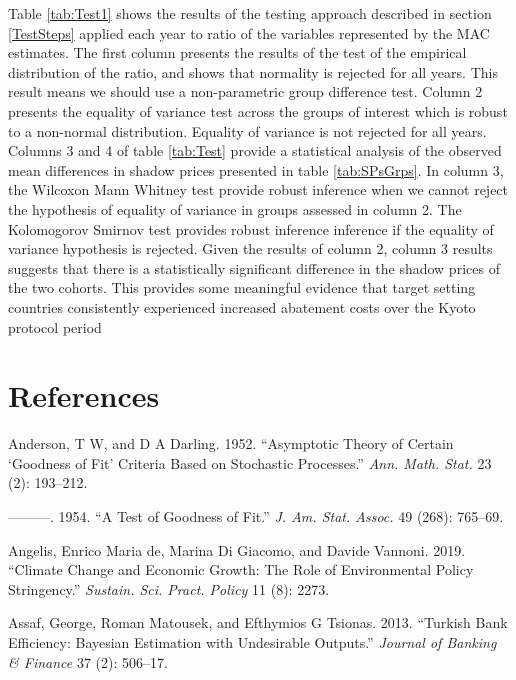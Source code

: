 \documentclass[
  12pt,
]{article}
\begin{document}
Table \ref{tab:Test1} shows the results of the testing approach described in section \ref{TestSteps} applied each year to ratio of the variables represented by the MAC estimates. The first column presents the results of the test of the empirical distribution of the ratio, and shows that normality is rejected for all years. This result means we should use a non-parametric group difference test. Column 2 presents the equality of variance test across the groups of interest which is robust to a non-normal distribution. Equality of variance is not rejected for all years. Columns 3 and 4 of table \ref{tab:Test} provide a statistical analysis of the observed mean differences in shadow prices presented in table \ref{tab:SPsGrps}. In column 3, the Wilcoxon Mann Whitney test provide robust inference when we cannot reject the hypothesis of equality of variance in groups assessed in column 2. The Kolomogorov Smirnov test provides robust inference inference if the equality of variance hypothesis is rejected. Given the results of column 2, column 3 results suggests that there is a statistically significant difference in the shadow prices of the two cohorts. This provides some meaningful evidence that target setting countries consistently experienced increased abatement costs over the Kyoto protocol period

\hypertarget{references}{%
\section*{References}\label{references}}

\hypertarget{refs}{}
\leavevmode\hypertarget{ref-Anderson1952}{}%
Anderson, T W, and D A Darling. 1952. ``Asymptotic Theory of Certain `Goodness of Fit' Criteria Based on Stochastic Processes.'' \emph{Ann. Math. Stat.} 23 (2): 193--212.

\leavevmode\hypertarget{ref-Anderson1954}{}%
---------. 1954. ``A Test of Goodness of Fit.'' \emph{J. Am. Stat. Assoc.} 49 (268): 765--69.

\leavevmode\hypertarget{ref-De_Angelis2019}{}%
Angelis, Enrico Maria de, Marina Di Giacomo, and Davide Vannoni. 2019. ``Climate Change and Economic Growth: The Role of Environmental Policy Stringency.'' \emph{Sustain. Sci. Pract. Policy} 11 (8): 2273.

\leavevmode\hypertarget{ref-Assaf2013}{}%
Assaf, George, Roman Matousek, and Efthymios G Tsionas. 2013. ``Turkish Bank Efficiency: Bayesian Estimation with Undesirable Outputs.'' \emph{Journal of Banking \& Finance} 37 (2): 506--17.
\end{document}
